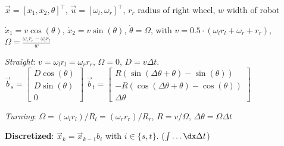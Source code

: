 
 $\vec{x} = [x_1, x_2, \theta]^\top$,
 $\vec{u} = [\omega_l, \omega_r]^\top$, $r_r$ radius of right wheel, $w$ width of robot

 $\dot{x}_1 = v\cos(\theta)$, $\dot{x}_2 = v\sin(\theta)$, $\dot{\theta} = \Omega$,
with $v = 0.5\cdot(\omega_l r_l + \omega_r + r_r)$, $\Omega = \frac{\omega_r r_r - \omega_l r_l}{w}$

\textit{Straight}: $v = \omega_l r_l = \omega_r r_r$, $\Omega = 0$, $D = v\Delta t$.\\
$\vec{b}_s = \begin{bmatrix}
        D \cos(\theta) \\
        D \sin(\theta) \\
        0
    \end{bmatrix}$
$\vec{b}_t = \begin{bmatrix}
    R(\sin(\Delta \theta + \theta) - \sin(\theta))\\
    -R(\cos(\Delta \theta + \theta) - \cos(\theta))\\
    \Delta \theta
\end{bmatrix}$

\textit{Turning}: $\Omega = (\omega_l r_l) / R_l\! =\! (\omega_r r_r) / R_r$, $R\! =\! v / \Omega$, $\Delta \theta\! =\! \Omega \Delta t$

\textbf{Discretized}: $\vec{x}_k = \vec{x}_{k - 1} b_i$ with $i \in \{s, t\}$. ($\int \ldots \dx \Delta t$)
